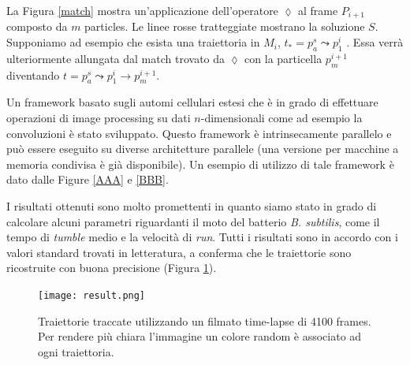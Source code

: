\documentclass[a4paper,11pt]{paper}
\begin{document}
La Figura \ref{match} mostra un'applicazione dell'operatore $\lozenge$ al frame $P_{i+1}$ composto da $m$ particles. Le linee rosse tratteggiate mostrano la soluzione $S$.
Supponiamo ad esempio che esista una traiettoria in $M_i$, $t_*=p^s_a \leadsto p^i_1$ . Essa verrà ulteriormente allungata dal match trovato da $\lozenge$ con la particella $p^{i+1}_m$ diventando $t=p^s_a \leadsto p^i_1 \to p^{i+1}_m$.

Un framework basato sugli automi cellulari estesi che è in grado di effettuare operazioni di image processing su dati $n$-dimensionali come ad esempio la convoluzioni è stato sviluppato. Questo framework è intrinsecamente parallelo e può essere eseguito su diverse architetture parallele (una versione per macchine a memoria condivisa è già disponibile). Un esempio di utilizzo di tale framework è dato dalle Figure \ref{AAA} e \ref{BBB}.

I risultati ottenuti sono molto promettenti in quanto siamo stato in grado di calcolare alcuni parametri riguardanti il moto del batterio \textit{B. subtilis}, come il tempo di \textit{tumble} medio e la velocità di \textit{run}. 
Tutti i risultati sono in accordo con i valori standard trovati in letteratura, a conferma che le traiettorie sono ricostruite con buona precisione (Figura \ref{fig:res}).

    \begin{figure}
      \begin{center}
        \texttt{[image: result.png]}
        \caption{Traiettorie traccate utilizzando un filmato time-lapse di 4100 frames. Per rendere più chiara l'immagine un colore random è associato ad ogni traiettoria.}\label{fig:res}
      \end{center}
    \end{figure}
\end{document}
